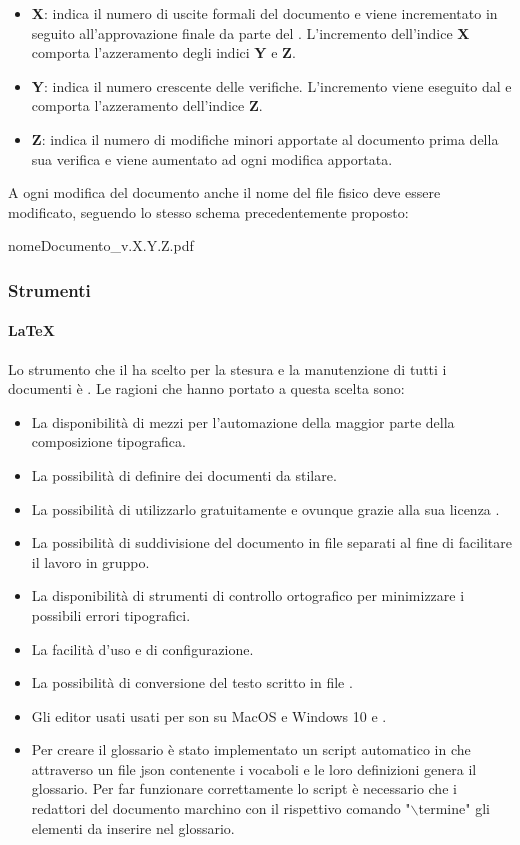 \begin{itemize}
  \item \textbf{X}: indica il numero di uscite formali del documento e viene incrementato in seguito all'approvazione finale da parte del \textit{\Pm}.
  L'incremento dell'indice \textbf{X} comporta l'azzeramento degli indici
  \textbf{Y} e \textbf{Z}.
  \item \textbf{Y}: indica il numero crescente delle verifiche. L'incremento viene 	eseguito dal \textit{\Ver} e comporta l'azzeramento dell'indice \textbf{Z}.
  \item \textbf{Z}: indica il numero di modifiche minori apportate al documento
  prima della sua verifica e viene aumentato ad ogni modifica apportata.
  \end{itemize}
A ogni modifica del documento anche il nome del file fisico deve essere
modificato, seguendo lo stesso schema precedentemente proposto:
\begin{center}
  nomeDocumento\_v.X.Y.Z.pdf
\end{center}

\subsubsection{Strumenti}
\paragraph{LaTeX}
Lo strumento che il  ha scelto per la stesura e la manutenzione di tutti i documenti è . Le ragioni che hanno portato a questa scelta sono:
\begin{itemize}
\item La disponibilità di mezzi per l'automazione della maggior parte della composizione tipografica.
\item La possibilità di definire  dei documenti da stilare.
\item La possibilità di utilizzarlo gratuitamente e ovunque grazie alla sua licenza .
\item La possibilità di suddivisione del documento in file separati al fine di facilitare il lavoro in gruppo.
\item La disponibilità di strumenti di controllo ortografico per minimizzare i possibili errori tipografici.
\item La facilità d'uso e di configurazione.
\item La possibilità di conversione del testo scritto in file .
\item Gli editor usati usati per  son  su MacOS e Windows 10 e .
\item Per creare il glossario è stato implementato un script automatico in  che attraverso un file json contenente i vocaboli e le loro definizioni genera il glossario. Per far funzionare correttamente lo script è necessario che i redattori del documento marchino con il rispettivo comando "$\backslash$termine" gli elementi da inserire nel glossario.
\end{itemize}

